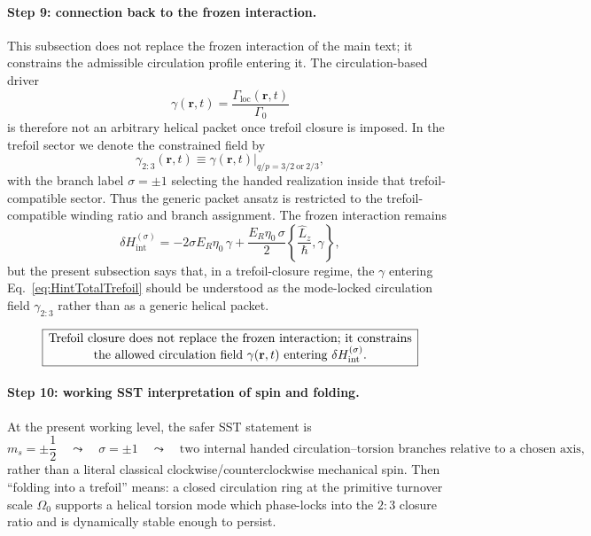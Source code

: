 \documentclass[11pt,a4paper]{article}
\newcommand{\boxedstatement}[1]{\fbox{\parbox{0.86\linewidth}{\centering #1}}}
\begin{document}
\paragraph{Step 9: connection back to the frozen interaction.}
This subsection does not replace the frozen interaction of the main text; it constrains the admissible circulation profile entering it. The circulation-based driver
\begin{equation}
\gamma(\mathbf r,t)=\frac{\Gamma_{\mathrm{loc}}(\mathbf r,t)}{\Gamma_0}
\label{eq:gammaFromTrefoil}
\end{equation}
is therefore not an arbitrary helical packet once trefoil closure is imposed. In the trefoil sector we denote the constrained field by
\begin{equation}
\gamma_{2{:}3}(\mathbf r,t)
\equiv
\gamma(\mathbf r,t)\Big|_{q/p=3/2\ \text{or}\ 2/3},
\label{eq:gamma23Def}
\end{equation}
with the branch label \(\sigma=\pm 1\) selecting the handed realization inside that trefoil-compatible sector. Thus the generic packet ansatz is restricted to the trefoil-compatible winding ratio and branch assignment. The frozen interaction remains
\begin{equation}
\delta H_{\mathrm{int}}^{(\sigma)}
=
-2\sigma E_R\eta_0\,\gamma
+
\frac{E_R\eta_0\,\sigma}{2}
\left\{\frac{\hat L_z}{\hbar},\gamma\right\},
\label{eq:HintTotalTrefoil}
\end{equation}
but the present subsection says that, in a trefoil-closure regime, the \(\gamma\) entering Eq.~\eqref{eq:HintTotalTrefoil} should be understood as the mode-locked circulation field \(\gamma_{2{:}3}\) rather than as a generic helical packet.

\begin{equation}
\boxedstatement{Trefoil closure does not replace the frozen interaction; it constrains the allowed circulation field $\gamma(\mathbf r,t)$ entering $\delta H_{\mathrm{int}}^{(\sigma)}$.}
\label{eq:boxedTrefoilConstrainsGamma}
\end{equation}

\paragraph{Step 10: working SST interpretation of spin and folding.}
At the present working level, the safer SST statement is
\begin{equation}
m_s=\pm\frac12
\quad\leadsto\quad
\sigma=\pm 1
\quad\leadsto\quad
\text{two internal handed circulation--torsion branches relative to a chosen axis,}
\label{eq:spinbranchworkingTrefoil}
\end{equation}
rather than a literal classical clockwise/counterclockwise mechanical spin. Then ``folding into a trefoil'' means: a closed circulation ring at the primitive turnover scale \(\Omega_0\) supports a helical torsion mode which phase-locks into the \(2{:}3\) closure ratio and is dynamically stable enough to persist.
\end{document}
